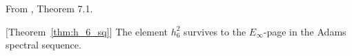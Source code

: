 \begin{theorem}
\label{paper:7.1}
From \cite{LWX126}, Theorem 7.1.\par
[Theorem~\ref{thm:h_6_sq}] \label{thm:126survives}
    The element $h_6^2$ survives to the $E_\infty$-page in the Adams spectral sequence.


\end{theorem}
